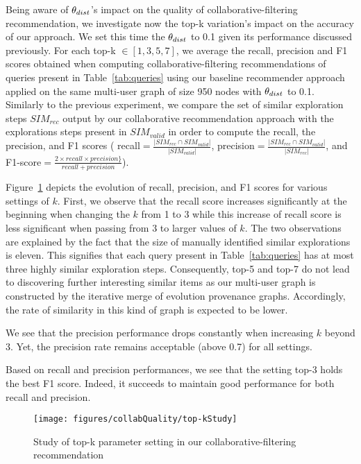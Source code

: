 Being aware of $\theta_{dist}$'s impact on the quality of collaborative-filtering recommendation, we investigate now the top-k variation's impact on the accuracy of our approach.
We set this time the $\theta_{dist}$ to 0.1 given its performance discussed previously. For each top-k  $\in [1,3,5,7]$, we average the recall, precision and F1 scores obtained when computing collaborative-filtering recommendations of queries present in Table~\ref{tab:queries} using  our baseline recommender approach applied on the same multi-user graph of size 950 nodes with $\theta_{dist}$ to 0.1.
Similarly to the previous experiment, we compare the set of similar exploration steps $SIM_{rec}$ output by our collaborative recommendation approach with the explorations steps present in $SIM_{valid}$ in order to compute the recall, the precision, and F1 scores ( recall$=\frac{|SIM_{rec} \cap SIM_{valid}|}{|SIM_{valid}|}$, precision$=\frac{|SIM_{rec} \cap SIM_{valid}|}{|SIM_{rec}|}$, and F1-score$=\frac{2 \times recall \times precision\}}{recall + precision}$).



Figure~\ref{fig:top-kstudy} depicts the evolution of recall, precision, and F1 scores for various settings of $k$.
First, we observe that the recall score increases significantly at the beginning when changing the $k$ from 1 to 3 while this increase of recall score is less significant when passing from $3$ to larger values of $k$. 
The two observations are explained by the fact that the size of manually identified similar explorations is eleven. This signifies that each query present in Table~\ref{tab:queries} has at most three highly similar exploration steps. Consequently, top-5 and top-7 do not lead to discovering further interesting similar items as our multi-user graph is constructed by the iterative merge of evolution provenance graphs. Accordingly, the rate of similarity in this kind of graph is expected to be lower.

We see that the precision performance drops constantly when increasing $k$ beyond 3. Yet, the precision rate remains acceptable (above 0.7) for all settings.

Based on recall and precision performances, we see that the setting top-3 holds the best F1 score. Indeed, it succeeds to maintain good performance for both recall and precision.

\begin{figure}[t]
\centering
\texttt{[image: figures/collabQuality/top-kStudy]}
\caption{Study of top-k parameter setting in our collaborative-filtering recommendation}
\label{fig:top-kstudy}
\end{figure} 

